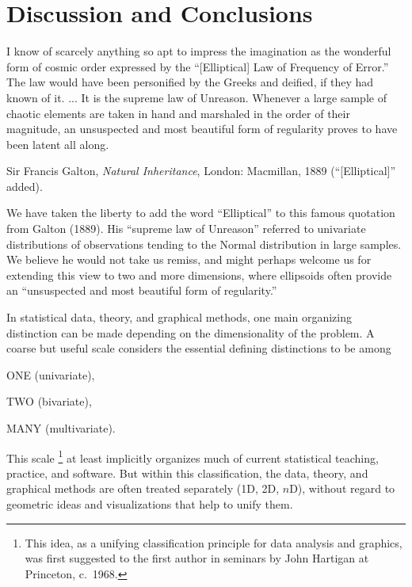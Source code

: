 \section{Discussion and Conclusions}

\epigraph{I know of scarcely anything so apt to impress the imagination as the
wonderful form of cosmic order expressed by the ``[Elliptical] Law of Frequency of
Error.''
The law would have been personified by the Greeks and deified, if they had known of it.
... %
    It is the supreme law of Unreason.
	Whenever a large sample of chaotic elements are taken in hand
	and marshaled in the order of their magnitude,
	an unsuspected and most beautiful form of regularity proves to have been
	latent all along.
}
{Sir Francis Galton, \emph{Natural Inheritance}, London: Macmillan, 1889
(``[Elliptical]'' added).
}

We have taken the liberty to add the word ``Elliptical'' to this famous quotation from Galton (1889).
His ``supreme law of Unreason'' referred to univariate distributions of observations tending to the
Normal distribution in large samples.  We believe he would not take us remiss, and might perhaps
welcome us for extending this view to
two and more dimensions, where ellipsoids often provide
an ``unsuspected and most beautiful form of regularity.''

In statistical data, theory, and graphical methods, one main organizing
distinction can be made depending
on the dimensionality of the problem.  A coarse but useful scale considers the essential defining
distinctions to be among
\begin{itemize*}
 \item ONE (univariate),
 \item TWO (bivariate),
 \item MANY (multivariate).
\end{itemize*}
This scale%
\footnote{
This idea, as a unifying classification principle for data analysis and graphics,
was first suggested to the first author in
seminars by John Hartigan at Princeton, c.~1968.
}
at least implicitly organizes much of current statistical teaching, practice, and software.
But within this classification, the data, theory, and graphical methods are often treated separately (1D, 2D, $n$D),
without regard to geometric ideas and visualizations that help to unify them.

